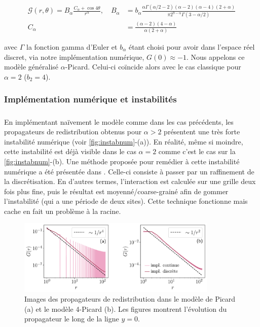 \begin{equation}
\begin{aligned}
    \mathcal{G}(r, \theta) = B_\alpha\frac{C_\alpha+\cos 4\theta}{r^\alpha}, \quad B_\alpha &= b_\alpha\frac{\alpha\Gamma(\alpha/2-2)(\alpha-2)(\alpha-4)(2+\alpha)}{\pi 2^{9-\alpha}\Gamma(3-\alpha/2)}\\
    C_\alpha &= \frac{(\alpha-2)(4-\alpha)}{\alpha (2+\alpha)}
\end{aligned}
    \label{eq:RealAlphaPicard}
\end{equation}

\noindent avec $\Gamma$ la fonction gamma d'Euler et $b_\alpha$ étant choisi pour avoir dans l'espace réel discret, via notre implémentation numérique, $G(0)\approx-1$. Nous appelons ce modèle généralisé $\alpha$-Picard. Celui-ci coïncide alors avec le cas classique pour $\alpha=2$ ($b_2 = 4$).

\subsubsection{Implémentation numérique et instabilités}

\label{sec:instab_yielding}

\subparagraph{}En implémentant naïvement le modèle comme dans les cas précédents, les propagateurs de redistribution obtenus pour $\alpha>2$ présentent une très forte instabilité numérique (voir \autoref{fig:instabnum}-(a)). En réalité, même si moindre, cette instabilité est déjà visible dans le cas $\alpha=2$ comme c'est le cas sur la \autoref{fig:instabnum}-(b). Une méthode proposée pour remédier à cette instabilité numérique a été présentée dans \cite{nicolas_ecoulements_2014}. Celle-ci consiste à passer par un raffinement de la discrétisation. En d'autres termes, l'interaction est calculée sur une grille deux fois plus fine, puis le résultat est moyenné/coarse-grainé afin de gommer l'instabilité (qui a une période de deux sites). Cette technique fonctionne mais cache en fait un problème à la racine. 

\begin{figure}[h]
	\centering
	\includegraphics[width=0.85\textwidth]{Chapitre4/Figures/LonguePortee/ResolutionOscillationsPropagateur.pdf}
	\caption{Images des propagateurs de redistribution dans le modèle de Picard (a) et le modèle 4-Picard (b). Les figures montrent l'évolution du propagateur le long de la ligne $y=0$.}
	\label{fig:instabnum}
\end{figure}

